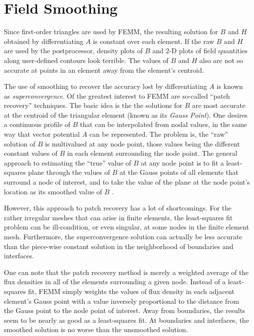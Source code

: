 \documentclass[12pt]{report}
\begin{document}
\section{Field Smoothing}

Since first-order triangles are used by FEMM, the resulting
solution for $B$ and $H$ obtained by differentiating $A$ is
constant over each element. If the raw $B$ and $H$ are used by the
postprocessor, density plots of $B$ and 2-D plots of field
quantities along user-defined contours look terrible. The values of
$B$ and $H$ also are not so accurate at points in an element away
from the element's centroid.

The use of smoothing to recover the accuracy lost by
differentiating $A$ is known as {\em superconvergence}. Of the
greatest interest to FEMM are so-called ``patch recovery''
techniques. The basic idea is the the solutions for $B$ are most
accurate at the centroid of the triangular element (known as its
{\em Gauss Point}). One desires a continuous profile of $B$ that
can be interpolated from nodal values, in the same way that vector
potential $A$ can be represented. The problem is, the ``raw''
solution of $B$ is multivalued at any node point, those values
being the different constant values of $B$ in each element
surrounding the node point. The general approach to estimating the
``true'' value of $B$ at any node point is to fit a least-squares
plane through the values of $B$ at the Gauss points of all elements
that surround a node of interest, and to take the value of the
plane at the node point's location as its smoothed value of $B$
\cite{zen}.

However, this approach to patch recovery has a lot of shortcomings.
For the rather irregular meshes that can arise in finite elements,
the least-squares fit problem can be ill-condition, or even
singular, at some nodes in the finite element mesh.  Furthermore,
the superconvergence solution can actually be less accurate than
the piece-wise constant solution in the neighborhood of boundaries
and interfaces.

One can note that the patch recovery method is merely a weighted
average of the flux densities in all of the elements surrounding a
given node.  Instead of a least-squares fit, FEMM simply weights
the values of flux density in each adjacent element's Gauss point
with a value inversely proportional to the distance from the Gauss
point to the node point of interest.  Away from boundaries, the
results seem to be nearly as good as a least-squares fit.  At
boundaries and interfaces, the smoothed solution is no worse than
the unsmoothed solution.
\end{document}
